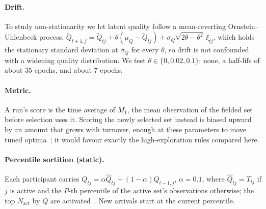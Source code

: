 \documentclass[sigconf,anonymous,review,nonacm]{acmart}
\begin{document}
\paragraph{Drift.} To study non-stationarity we let latent quality follow a mean-reverting
Ornstein--Uhlenbeck process,
$\tilde Q_{t+1,j}=\tilde Q_{tj}+\theta(\mu_Q-\tilde Q_{tj})+\sigma_Q\sqrt{2\theta-\theta^2}\,\xi_{tj}$,
which holds the stationary standard deviation at $\sigma_Q$ for every $\theta$, so drift is
not confounded with a widening quality distribution. We test $\theta\in\{0,0.02,0.1\}$:
none, a half-life of about $35$ epochs, and about $7$ epochs.

\paragraph{Metric.} A run's score is the time average of $M_1$, the mean observation of the
fielded set before selection uses it. Scoring the newly selected set instead is biased
upward by an amount that grows with turnover, enough at these parameters to move tuned
optima~\cite{companionA}; it would favour exactly the high-exploration rules compared here.

\paragraph{Percentile sortition (static).} Each participant carries
$Q_{tj}=\alpha\hat Q_{tj}+(1-\alpha)Q_{t-1,j}$, $\alpha=0.1$, where $\hat Q_{tj}=T_{tj}$ if
$j$ is active and the $P$-th percentile of the active set's observations otherwise; the top
$N_{\mathrm{act}}$ by $Q$ are activated~\cite{kruijssen2024}. New arrivals start at the
current percentile.
\end{document}

